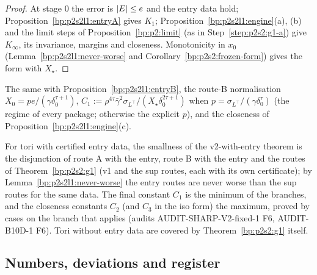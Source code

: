 \begin{proof}
\label{step:p2s2l1:g1A}
At stage $0$ the error is $\lvert E\rvert\le e$ and the entry data hold; Proposition~\ref{bp:p2s2l1:entryA} gives $K_1$; Proposition~\ref{bp:p2s2l1:engine}(a), (b) and the
limit steps of Proposition~\ref{bp:p2:limit} (as in Step~\ref{step:p2s2:g1-a}) give $K_\infty$, its invariance, margins and closeness. Monotonicity in $x_0$
(Lemma~\ref{bp:p2s2l1:never-worse} and Corollary~\ref{bp:p2s2:frozen-form}) gives the form with $X_\star$.
\end{proof}

\begin{theorem}\label{bp:p2s2l1:g1B}
The same with Proposition~\ref{bp:p2s2l1:entryB}, the route-B normalisation $X_0=pe/(\gamma\delta_0^{\tau+1})$, $C_1:=\rho^{4\tau}\bar\gamma^2\sigma_{L^\top}/(X_\star\delta_0^{2\tau+1})$ when
$p=\sigma_{L^\top}/(\gamma\delta_0^\tau)$ (the regime of every package; otherwise the explicit $p$), and the closeness of Proposition~\ref{bp:p2s2l1:engine}(c).
\end{theorem}

\begin{corollary}\label{bp:p2s2l1:frozen}
For tori with certified entry data, the smallness of the v2-with-entry theorem is the disjunction of route A with the entry, route B with the
entry and the routes of Theorem~\ref{bp:p2s2:g1} (v1 and the sup routes, each with its own certificate); by Lemma~\ref{bp:p2s2l1:never-worse} the entry
routes are never worse than the sup routes for the same data. The final constant $C_1$ is the minimum of the branches, and the closeness constants
$C_2$ (and $C_3$ in the iso form) the maximum, proved by cases on the branch that applies (audits AUDIT-SHARP-V2-fixed-1 F6, AUDIT-B10D-1 F6). Tori
without entry data are covered by Theorem~\ref{bp:p2s2:g1} itself.
\end{corollary}

\subsection{Numbers, deviations and register}\label{bp:p2s2l1:sec-register}

